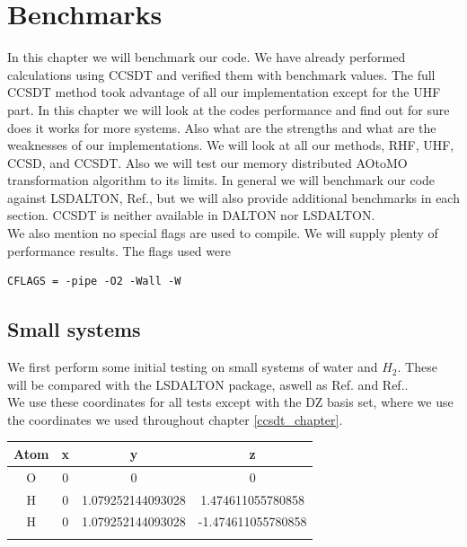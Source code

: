 \documentclass[a4paper,norsk,11pt,twoside]{report}
\begin{document}
\chapter{Benchmarks}
In this chapter we will benchmark our code. We have already performed calculations using CCSDT and verified them with benchmark values. The full CCSDT method took advantage of all our implementation except for the UHF part. In this chapter we will look at the codes performance and find out for sure does it works for more systems. Also what are the strengths and what are the weaknesses of our implementations. We will look at all our methods, RHF, UHF, CCSD, and CCSDT. Also we will test our memory distributed AOtoMO transformation algorithm to its limits. In general we will benchmark our code against LSDALTON, Ref.\cite{LSDALTON_CITATION}, but we will also provide additional benchmarks in each section. CCSDT is neither available in DALTON nor LSDALTON. \\

We also mention no special flags are used to compile. We will supply plenty of performance results. The flags used were 

\begin{lstlisting}
CFLAGS = -pipe -O2 -Wall -W 
\end{lstlisting}

\section{Small systems}
We first perform some initial testing on small systems of water and $H_2$. These will be compared with the LSDALTON package, aswell as Ref.\cite{ccsd_benchmark_url_stuff} and Ref.\cite{CCSDT-ref1}. \\

We use these coordinates for all tests except with the DZ basis set, where we use the coordinates we used throughout chapter \ref{ccsdt_chapter}.  

\begin{center}
  \begin{tabular}{ c c c c }
  \hline
     Atom & x & y & z \\ \hline
     O & 0 & 0 & 0 \\
     H & 0 & 1.079252144093028 & 1.474611055780858 \\
     H & 0 & 1.079252144093028 & -1.474611055780858 \\
     \hline \\
  \end{tabular} 
\end{center} 
\end{document}
